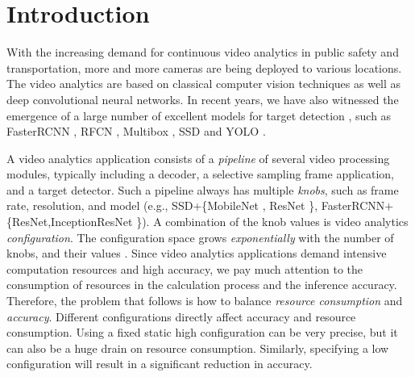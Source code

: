 \section{Introduction}

\label{Section: introduction}
With the increasing demand for continuous video analytics in public safety and transportation, more and more cameras are being deployed to various locations. The video analytics are based on classical computer vision techniques as well as deep convolutional neural networks. In recent years, we have also witnessed the emergence of a large number of excellent models for target detection \cite{trade-offs}, such as FasterRCNN \cite{ren2015faster_rcnn}, RFCN \cite{dai2016r_fcn}, Multibox \cite{szegedy2014multibox}, SSD \cite{liu2016ssd} and YOLO \cite{redmon2016yolo}.


A video analytics application consists of a \emph{pipeline} of several video processing modules, typically including a decoder, a selective sampling frame application, and a target detector. Such a pipeline always has multiple \emph{knobs}, such as frame rate, resolution, and model (e.g., SSD+\{MobileNet \cite{MobileNetV2}, ResNet \cite{he2016resnet}\}, FasterRCNN+\{ResNet,InceptionResNet \cite{szegedy2016inception}\}). A combination of the knob values is video analytics \emph{configuration}. The configuration space grows \emph{exponentially} with the number of knobs, and their values \cite{jiang2018chameleon}. Since video analytics applications demand intensive computation resources and high accuracy, we pay much attention to the consumption of resources in the calculation process and the inference accuracy. Therefore, the problem that follows is how to balance \emph{resource consumption} and \emph{accuracy}. Different configurations directly affect accuracy and resource consumption. Using a fixed static high configuration can be very precise, but it can also be a huge drain on resource consumption. Similarly, specifying a low configuration will result in a significant reduction in accuracy.

